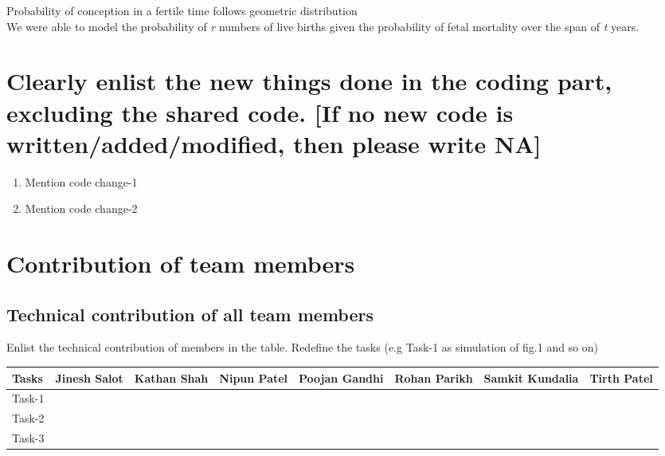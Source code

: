 \documentclass{article}
\begin{document}
Probability of conception in a fertile time follows geometric distribution\\


We were able to model the probability of {\itshape r} numbers of live births given the probability of fetal mortality over the span of {\itshape t} years.


\section{Clearly enlist the new things done in the coding part, excluding the shared code. [If no new code is written/added/modified, then please write NA]}

\begin{enumerate}
    \item Mention code change-1
    \item Mention code change-2
\end{enumerate}



\section{Contribution of team members}	
\subsection{Technical contribution of all team members }
Enlist the technical contribution of members in the table. Redefine the tasks (e.g Task-1 as simulation of fig.1 and so on)
\begin{table}[h]
\centering
\begin{tabular}{|l|l|l|l|l|l|l|l}
\hline
Tasks  & Jinesh Salot & Kathan Shah & Nipun Patel & Poojan Gandhi & Rohan Parikh & Samkit Kundalia & Tirth Patel \\ \hline
Task-1 &      &       &        &          &     &       &         \\ \hline
Task-2 &      &       &        &          &     &       &         \\ \hline
Task-3 &      &       &        &          &     &       &       \\ \hline
\end{tabular}
\end{table}
\end{document}
